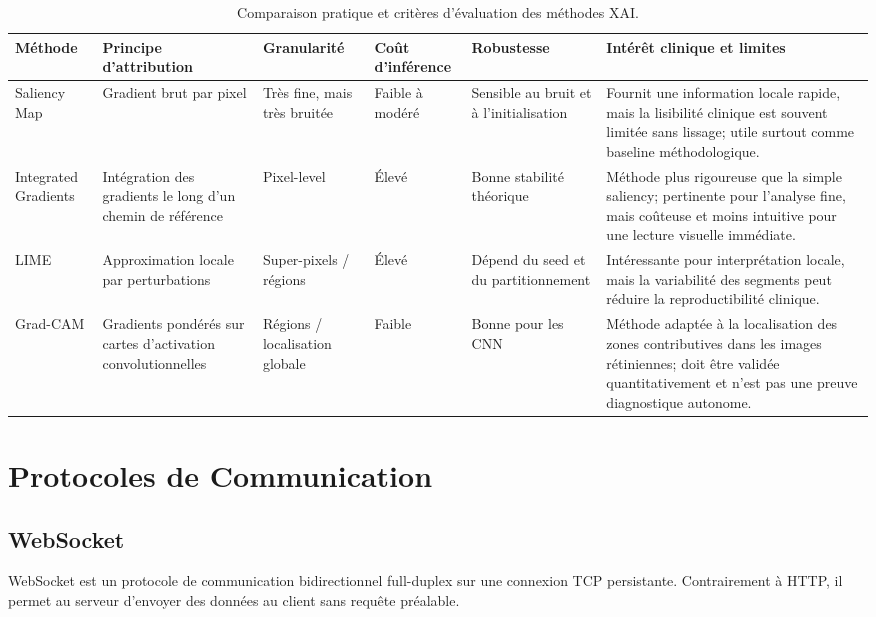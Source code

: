 \documentclass[12pt,a4paper,oneside]{report}
\begin{document}
\begin{table}[H]
\centering
\caption{Comparaison pratique et critères d'évaluation des méthodes XAI.}
\label{tab:xai_comparison}
\begin{tabular}{|l|p{3.2cm}|p{2.8cm}|p{2.6cm}|p{2.6cm}|p{4.7cm}|}
\hline
\textbf{Méthode} & \textbf{Principe d'attribution} & \textbf{Granularité} & \textbf{Coût d'inférence} & \textbf{Robustesse} & \textbf{Intérêt clinique et limites} \\
\hline
Saliency Map & Gradient brut par pixel & Très fine, mais très bruitée & Faible à modéré & Sensible au bruit et à l'initialisation & Fournit une information locale rapide, mais la lisibilité clinique est souvent limitée sans lissage; utile surtout comme baseline méthodologique. \\
Integrated Gradients & Intégration des gradients le long d'un chemin de référence & Pixel-level & Élevé & Bonne stabilité théorique & Méthode plus rigoureuse que la simple saliency; pertinente pour l'analyse fine, mais coûteuse et moins intuitive pour une lecture visuelle immédiate. \\
LIME & Approximation locale par perturbations & Super-pixels / régions & Élevé & Dépend du seed et du partitionnement & Intéressante pour interprétation locale, mais la variabilité des segments peut réduire la reproductibilité clinique. \\
Grad-CAM & Gradients pondérés sur cartes d'activation convolutionnelles & Régions / localisation globale & Faible & Bonne pour les CNN & Méthode adaptée à la localisation des zones contributives dans les images rétiniennes; doit être validée quantitativement et n'est pas une preuve diagnostique autonome. \\
\hline
\end{tabular}
\end{table}

\section{Protocoles de Communication}

\subsection{WebSocket}

WebSocket est un protocole de communication bidirectionnel full-duplex
sur une connexion TCP persistante. Contrairement à HTTP, il permet
au serveur d'envoyer des données au client sans requête préalable.
\end{document}
